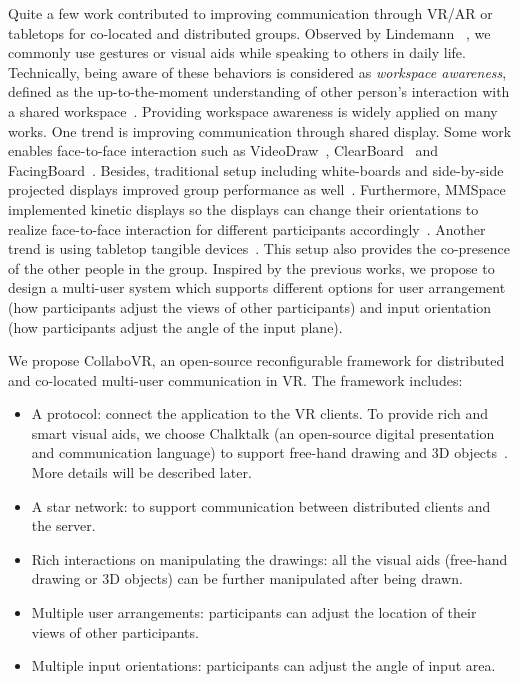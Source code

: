 \documentclass{sigchi}
\begin{document}
Quite a few work contributed to improving communication through VR/AR or tabletops for co-located and distributed groups. Observed by Lindemann ~\cite{tversky2003human}, we commonly use gestures or visual aids while speaking to others in daily life. Technically, being aware of these behaviors is considered as \textit{workspace awareness}, defined as the up-to-the-moment understanding of other person's interaction with a shared workspace~\cite{li2014interactive}. Providing workspace awareness is widely applied on many works. 
One trend is improving communication through shared display. Some work enables face-to-face interaction such as VideoDraw~\cite{tang1990videodraw}, ClearBoard~\cite{ishii1993integration} and FacingBoard~\cite{li2014interactive}. Besides, traditional setup including white-boards and side-by-side projected displays improved group performance as well~\cite{plaue2009presence}. Furthermore, MMSpace implemented kinetic displays so the displays can change their orientations to realize face-to-face interaction for different participants accordingly~\cite{otsuka2016mmspace}.
Another trend is using tabletop tangible devices~\cite{brave1998tangible, kunert2019multi}. This setup also provides the co-presence of the other people in the group. Inspired by the previous works, we propose to design a multi-user system which supports different options for user arrangement (how participants adjust the views of other participants) and input orientation (how participants adjust the angle of the input plane).

We propose CollaboVR, an open-source reconfigurable framework for distributed and co-located multi-user communication in VR. The framework includes:
\begin{itemize}
    \item A protocol: connect the application to the VR clients. To provide rich and smart visual aids, we choose Chalktalk (an open-source digital presentation and communication language) to support free-hand drawing and 3D objects~\cite{perlin2018chalktalk}. More details will be described later.
    \item A star network: to support communication between distributed clients and the server.
    \item Rich interactions on manipulating the drawings: all the visual aids (free-hand drawing or 3D objects) can be further manipulated after being drawn.
    \item Multiple user arrangements: participants can adjust the location of their views of other participants.
    \item Multiple input orientations: participants can adjust the angle of input area.
\end{itemize}
\end{document}
